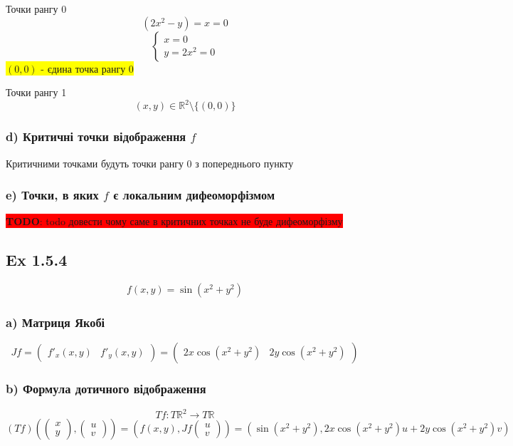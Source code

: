 \documentclass[10pt, a4paper]{article} %
\newcommand{\R}{\mathbb{R}}
\newcommand{\J}{J}
\newcommand{\todo}[1]{\colorbox{red}{\textbf{TODO}: #1}}
\begin{document}
Точки рангу 0
\[(2x^2-y)=x=0\]
\[\begin{cases}
    x = 0\\
    y = 2x^2 = 0
\end{cases}\]
\colorbox{yellow}{$(0,0)$ - єдина точка рангу 0}

Точки рангу 1
\[(x,y) \in \R^2 \setminus \{(0,0)\}\]

\subsubsection*{d) Критичні точки відображення $f$}

Критичними точками будуть точки рангу 0 з попереднього пункту

\subsubsection*{e) Точки, в яких $f$ є локальним дифеоморфізмом}
\todo{todo довести чому саме в критичних точках не буде дифеоморфізму}


\subsection*{Ex 1.5.4}
\begin{mdframed}
    \[f(x,y) = \sin(x^2+y^2)\]
\end{mdframed}

\subsubsection*{a) Матриця Якобі}
\[\J f = \begin{pmatrix}
    f'_x(x,y) & f'_y(x,y)
\end{pmatrix} = \begin{pmatrix}
    2x\cos(x^2+y^2) & 2y\cos(x^2+y^2)
\end{pmatrix}\]

\subsubsection*{b) Формула дотичного відображення}
\[Tf : T\R^2 \to T\R\]
\[(Tf)\left(\begin{pmatrix} x \\ y \end{pmatrix}, \begin{pmatrix} u \\ v \end{pmatrix}\right) 
= \left(f(x,y),\J f \begin{pmatrix} u \\ v \end{pmatrix}\right) 
= \left(\sin(x^2+y^2), 2x\cos(x^2+y^2)u + 2y\cos(x^2+y^2)v\right)\]
\end{document}

